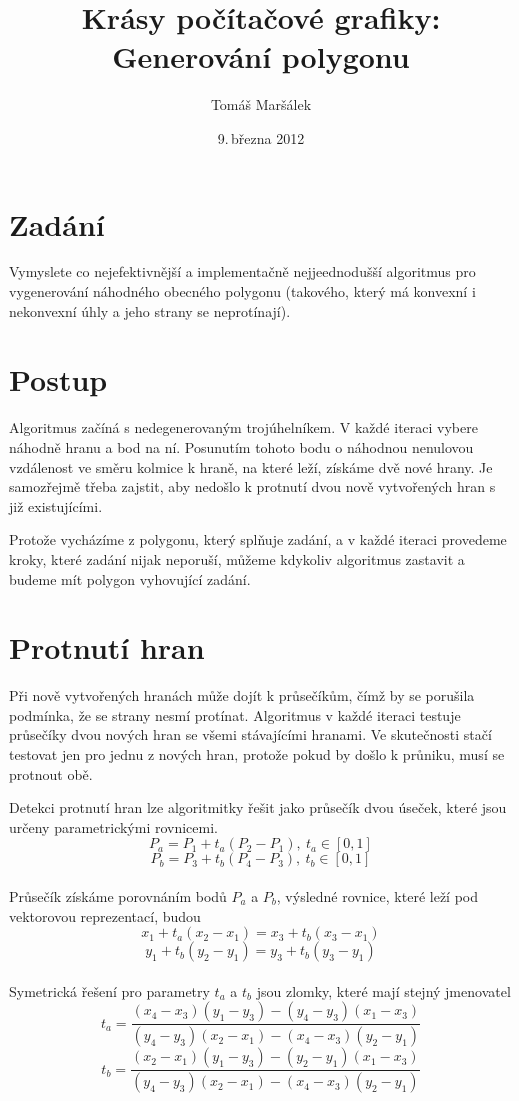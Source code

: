 \documentclass[11pt]{article}
\title{Krásy počítačové grafiky: Generování polygonu}
\author{Tomáš Maršálek}
\date{9.\,března 2012}
\begin{document}
\maketitle

\section{Zadání}
Vymyslete co nejefektivnější a implementačně nejjeednodušší algoritmus pro
vygenerování náhodného  obecného polygonu (takového, který má konvexní i
nekonvexní úhly a jeho strany se neprotínají).

\section{Postup}
Algoritmus začíná s nedegenerovaným trojúhelníkem. V každé iteraci vybere
náhodně hranu a bod na ní. Posunutím tohoto bodu o náhodnou nenulovou
vzdálenost ve směru kolmice k hraně, na které leží, získáme dvě nové hrany. Je
samozřejmě třeba zajstit, aby nedošlo k protnutí dvou nově vytvořených hran s
již existujícími. 

Protože vycházíme z polygonu, který splňuje zadání, a v každé iteraci provedeme
kroky, které zadání nijak neporuší, můžeme kdykoliv algoritmus zastavit a
budeme mít polygon vyhovující zadání.

\section{Protnutí hran}
Při nově vytvořených hranách může dojít k průsečíkům, čímž by se porušila
podmínka, že se strany nesmí protínat. Algoritmus v každé iteraci testuje
průsečíky dvou nových hran se všemi stávajícími hranami. Ve skutečnosti stačí
testovat jen pro jednu z nových hran, protože pokud by došlo k průniku, musí se
protnout obě.

Detekci protnutí hran lze algoritmitky řešit jako průsečík dvou úseček, které
jsou určeny parametrickými rovnicemi.
$$P_a = P_1 + t_a (P_2 - P_1),\ t_a \in [0, 1]$$
$$P_b = P_3 + t_b (P_4 - P_3),\ t_b \in [0, 1]$$ \\

Průsečík získáme porovnáním bodů $P_a$ a $P_b$, výsledné rovnice, které leží
pod vektorovou reprezentací, budou
$$x_1 + t_a (x_2 - x_1) = x_3 + t_b (x_3 - x_1)$$
$$y_1 + t_b (y_2 - y_1) = y_3 + t_b (y_3 - y_1)$$ \\

Symetrická řešení pro parametry $t_a$ a $t_b$ jsou zlomky, které mají stejný
jmenovatel
$$t_a = \frac{(x_4 - x_3)(y_1 - y_3) - (y_4 - y_3)(x_1 - x_3)} 
             {(y_4 - y_3)(x_2 - x_1) - (x_4 - x_3)(y_2 - y_1)}$$
$$t_b = \frac{(x_2 - x_1)(y_1 - y_3) - (y_2 - y_1)(x_1 - x_3)}
             {(y_4 - y_3)(x_2 - x_1) - (x_4 - x_3)(y_2 - y_1)}$$ \\
\end{document}
